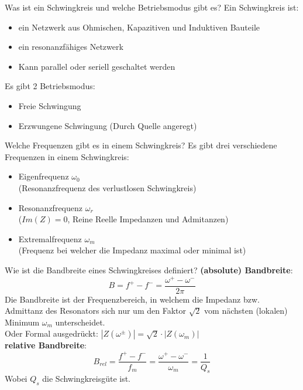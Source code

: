 
\begin{karte}{Was ist ein Schwingkreis und welche Betriebsmodus gibt es?}
	Ein Schwingkreis ist:
	\begin{itemize}
		\item ein Netzwerk aus Ohmischen, Kapazitiven und Induktiven Bauteile
		\item ein resonanzfähiges Netzwerk
		\item Kann parallel oder seriell geschaltet werden
	\end{itemize}
	Es gibt 2 Betriebsmodus:
	\begin{itemize}
		\item Freie Schwingung 
		\item Erzwungene Schwingung (Durch Quelle angeregt)
	\end{itemize}
\end{karte}

\begin{karte}{Welche Frequenzen gibt es in einem Schwingkreis?}
	Es gibt drei verschiedene Frequenzen in einem Schwingkreis:
	\begin{itemize}
		\item Eigenfrequenz $\omega_0$\\
		(Resonanzfrequenz des verlustlosen Schwingkreis)
		\item Resonanzfrequenz $\omega_r$\\
		($Im(Z) = 0$, Reine Reelle Impedanzen und Admitanzen)
		\item Extremalfrequenz $\omega_m$\\
		(Frequenz bei welcher die Impedanz maximal oder minimal ist)
	\end{itemize}
\end{karte}

\begin{karte}{Wie ist die Bandbreite eines Schwingkreises definiert?}
	\textbf{(absolute) Bandbreite}:
	\begin{equation*}
		B = f^+ - f^- = \dfrac{\omega^+ - \omega^-}{2 \pi}
	\end{equation*}
	Die Bandbreite ist der Frequenzbereich, in welchem die Impedanz bzw. Admittanz des Resonators sich nur um den Faktor $\sqrt{2}$ vom nächsten (lokalen) Minimum $\omega_m$ unterscheidet.\\
	Oder Formal ausgedrückt: \quad $|Z (\omega^{\pm})|=\sqrt{2}\cdot|Z(\omega_{m})|$\\
	\textbf{relative Bandbreite}:
	\begin{equation*}
	B_{rel} = \frac{f^+ - f^-}{f_m} = \frac{\omega^+ - \omega^-}{\omega_m} =\frac{1}{Q_s}
	\end{equation*}
	Wobei $Q_s$ die Schwingkreisgüte ist.
\end{karte}


